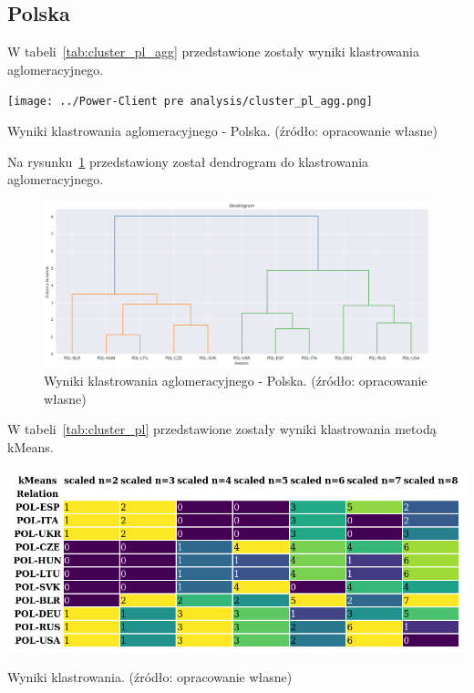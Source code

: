 \documentclass[11pt]{report}
\begin{document}
    \subsection{Polska}
    W tabeli~\ref{tab:cluster_pl_agg} przedstawione zostały wyniki klastrowania aglomeracyjnego.
    \begin{table}[!htp]
        \centering
        \texttt{[image: ../Power-Client pre analysis/cluster\_pl\_agg.png]}
        \caption{Wyniki klastrowania aglomeracyjnego - Polska. (źródło: opracowanie własne)}
        \label{tab:cluster_pl_agg}
    \end{table}
    Na rysunku~\ref{fig:cluster_pl_agg_dendrogram} przedstawiony został dendrogram do klastrowania aglomeracyjnego.
    \begin{figure}[!htp]
        \centering
        \includegraphics[width=\linewidth]{../Power-Client pre analysis/cluster_pl_agg_dendrogram.png}
        \caption{Wyniki klastrowania aglomeracyjnego - Polska. (źródło: opracowanie własne)}
        \label{fig:cluster_pl_agg_dendrogram}
    \end{figure}

    W tabeli~\ref{tab:cluster_pl} przedstawione zostały wyniki klastrowania metodą kMeans.
    \begin{table}[!htp]
        \centering
        \includegraphics[width=\linewidth]{../Power-Client pre analysis/cluster_pl.png}
        \caption{Wyniki klastrowania. (źródło: opracowanie własne)}
        \label{tab:cluster_pl}
    \end{table}
\end{document}
